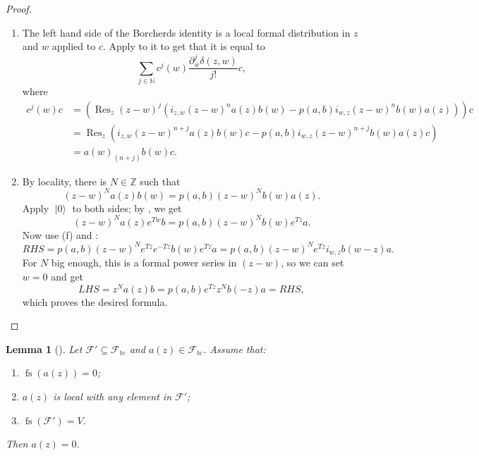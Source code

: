 \documentclass[a4paper, 12pt, reqno]{amsart}
\newtheorem{lemma}[theorem]{Lemma}
\theoremstyle{remark}
\numberwithin{equation}{subsection}
\DeclareMathOperator{\Res}{Res}
\DeclareMathOperator{\vac}{|0\rangle}
\DeclareMathOperator{\fs}{fs}
\DeclareMathOperator{\tc}{tc}
\begin{document}
\begin{proof}
\begin{enumerate}
  \item The left hand side of the Borcherds identity is a local formal distribution in $z$ and $w$ applied to $c$.
    Apply  to it to get that it is equal to
    \begin{equation*}
      \sum_{j \in \mathbb{N}} c^j(w)\frac{\partial^j_w\delta(z,w)}{j!}c,
    \end{equation*}
    where
    \begin{align*}
      c^j(w)c &= (\Res_z(z - w)^j(i_{z, w}(z - w)^na(z)b(w) - p(a, b)i_{w, z}(z - w)^nb(w)a(z)))c \\
      &= \Res_z(i_{z, w}(z - w)^{n + j}a(z)b(w)c - p(a, b)i_{w, z}(z - w)^{n + j}b(w)a(z)c) \\
      &= a(w)_{(n + j)}b(w)c.
    \end{align*}
  \item By locality, there is $N \in \mathbb{Z}$ such that
    \begin{equation*}
      (z - w)^Na(z)b(w) = p(a, b)(z - w)^Nb(w)a(z).
    \end{equation*}
    Apply $\vac$ to both sides; by , we get
    \begin{equation*}
      (z - w)^Na(z)e^{Tw}b = p(a, b)(z - w)^Nb(w)e^{Tz}a.
    \end{equation*}
    Now use (f) and :
    \begin{equation*}
      RHS = p(a, b)(z - w)^Ne^{Tz}e^{-Tz}b(w)e^{Tz}a = p(a, b)(z - w)^Ne^{Tz}i_{w, z}b(w - z)a.
    \end{equation*}
    For $N$ big enough, this is a formal power series in $(z - w)$, so we can set $w = 0$ and get
    \begin{equation*}
      LHS = z^Na(z)b = p(a, b)e^{Tz}z^Nb(-z)a = RHS,
    \end{equation*}
    which proves the desired formula. \qedhere
  \end{enumerate}
\end{proof}

\begin{lemma}[{\cite[Lemma 3]{callegaro_introduction_2017}}]
  \label{lmm:7}
  Let $\mathcal{F}' \subseteq \mathcal{F}_{\tc}$ and $a(z) \in \mathcal{F}_{\tc}$.
  Assume that:
  \begin{enumerate}
  \item $\fs(a(z)) = 0$;
  \item $a(z)$ is local with any element in $\mathcal{F}'$;
  \item $\fs(\mathcal{F}') = V$.
  \end{enumerate}
  Then $a(z) = 0$.
\end{lemma}
\end{document}
